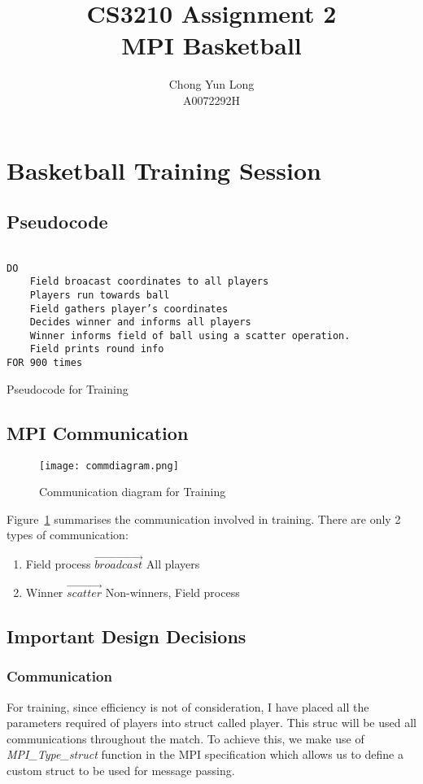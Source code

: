 \documentclass{article}
\title{CS3210 Assignment 2 \\ MPI Basketball}
\author{Chong Yun Long \\A0072292H}
\date{}
\begin{document}
\maketitle

\newpage 

\section{Basketball Training Session}

\subsection{Pseudocode}
\begin{program}[H]
\begin{verbatim}

DO
    Field broacast coordinates to all players
    Players run towards ball
    Field gathers player’s coordinates
    Decides winner and informs all players
    Winner informs field of ball using a scatter operation. 
    Field prints round info
FOR 900 times
\end{verbatim}
  \caption{Pseudocode for Training}
\end{program}

\subsection{MPI Communication}

\begin{figure}[H]
\centering
\texttt{[image: commdiagram.png]}
\caption{Communication diagram for Training}
\label{pic:commtrain}
\end{figure}

Figure~\ref{pic:commtrain} summarises the communication involved in training.  There are only 2 types of communication:

\begin{enumerate}
\item Field process $\overrightarrow{broadcast}$ All players
\item Winner $\overrightarrow{scatter}$ Non-winners, Field process
\end{enumerate}

\subsection{Important Design Decisions}

\subsubsection{Communication}
For training, since efficiency is not of consideration, I have placed all the parameters required of players into  struct called player.  This struc will be used all communications throughout the match. To achieve this, we make use of \textit{MPI\_Type\_struct} function in the MPI specification which allows us to define a custom struct to be used for message passing.
\end{document}

